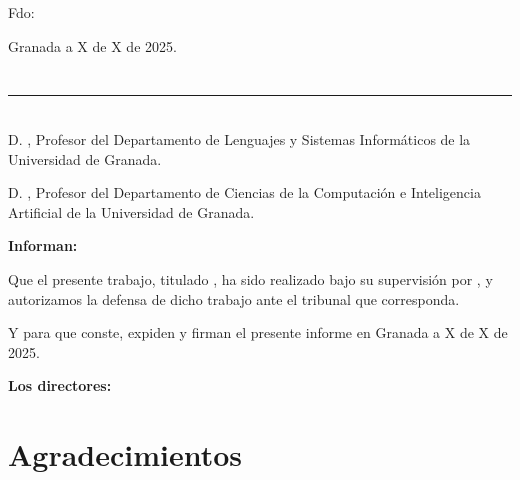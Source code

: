 \vspace{6cm}

\noindent Fdo: \myName

\vspace{2cm}

\begin{flushright}
Granada a X de X de 2025.
\end{flushright}


\chapter*{}
\thispagestyle{empty}

\noindent\rule[-1ex]{\textwidth}{2pt}\\[4.5ex]

D. \textbf{\myProf}, Profesor del Departamento de Lenguajes y Sistemas Informáticos de la Universidad de Granada.

\vspace{0.25cm}

D. \textbf{\myOtherProf}, Profesor del Departamento de Ciencias de la Computación e Inteligencia Artificial de la Universidad de Granada.


\vspace{0.25cm}

\textbf{Informan:}

\vspace{0.25cm}

Que el presente trabajo, titulado \textit{\textbf{\myTitle}},
ha sido realizado bajo su supervisión por \textbf{\myName}, y autorizamos la defensa de dicho trabajo ante el tribunal
que corresponda.

\vspace{0.5cm}

Y para que conste, expiden y firman el presente informe en Granada a X de X de 2025.

\vspace{0.5cm}

\textbf{Los directores:}

\vspace{5cm}

\noindent \textbf{\myProf \hfill
\myOtherProf}

\chapter*{Agradecimientos}
\thispagestyle{empty}

       \vspace{1cm}
